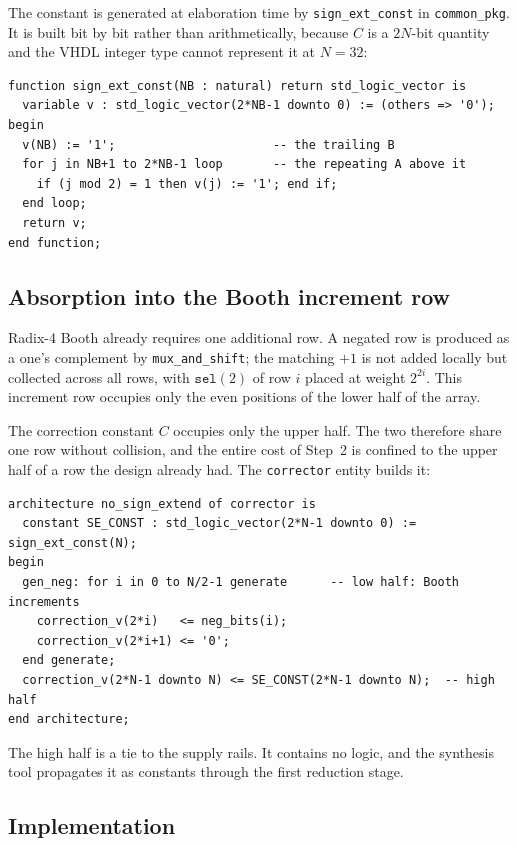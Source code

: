 \documentclass[11pt,a4paper]{article}
\begin{document}
The constant is generated at elaboration time by \texttt{sign\_ext\_const} in
\texttt{common\_pkg}. It is built bit by bit rather than arithmetically, because
$C$ is a $2N$-bit quantity and the VHDL integer type cannot represent it at
$N=32$:

\begin{lstlisting}[style=vhdl]
function sign_ext_const(NB : natural) return std_logic_vector is
  variable v : std_logic_vector(2*NB-1 downto 0) := (others => '0');
begin
  v(NB) := '1';                      -- the trailing B
  for j in NB+1 to 2*NB-1 loop       -- the repeating A above it
    if (j mod 2) = 1 then v(j) := '1'; end if;
  end loop;
  return v;
end function;
\end{lstlisting}

\subsection{Absorption into the Booth increment row}

Radix-4 Booth already requires one additional row. A negated row is produced as
a one's complement by \texttt{mux\_and\_shift}; the matching $+1$ is not added
locally but collected across all rows, with $\mathtt{sel}(2)$ of row $i$ placed
at weight $2^{2i}$. This increment row occupies only the even positions of the
lower half of the array.

The correction constant $C$ occupies only the upper half. The two therefore
share one row without collision, and the entire cost of Step~2 is
confined to the upper half of a row the design already had. The
\texttt{corrector} entity builds it:

\begin{lstlisting}[style=vhdl]
architecture no_sign_extend of corrector is
  constant SE_CONST : std_logic_vector(2*N-1 downto 0) := sign_ext_const(N);
begin
  gen_neg: for i in 0 to N/2-1 generate      -- low half: Booth increments
    correction_v(2*i)   <= neg_bits(i);
    correction_v(2*i+1) <= '0';
  end generate;
  correction_v(2*N-1 downto N) <= SE_CONST(2*N-1 downto N);  -- high half
end architecture;
\end{lstlisting}

The high half is a tie to the supply rails. It contains no logic, and the
synthesis tool propagates it as constants through the first reduction stage.

\subsection{Implementation}
\end{document}
